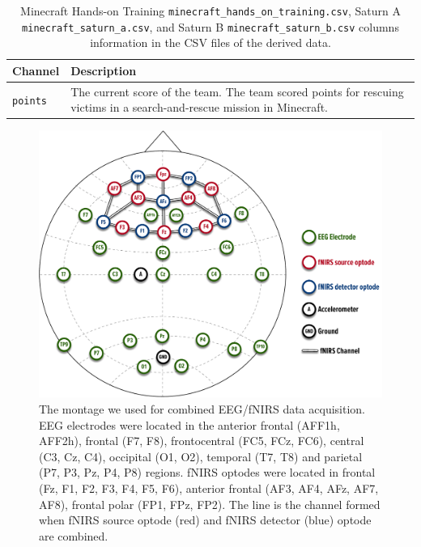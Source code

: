 
\begin{table}[h]
\centering
\begin{tabularx}{\textwidth}{lX}
    \toprule
Channel & Description \\
\midrule
\texttt{points} & The current score of the team. The team scored points for rescuing victims in a search-and-rescue mission in Minecraft.\\
\bottomrule
\end{tabularx}
\caption{Minecraft Hands-on Training \texttt{minecraft\_hands\_on\_training.csv}, Saturn A \texttt{minecraft\_saturn\_a.csv}, and Saturn B \texttt{minecraft\_saturn\_b.csv} columns information in the CSV files of the derived data.}
\label{tab:minecraft_task_columns}
\end{table}


\begin{figure}
  \includegraphics[width=\linewidth]{images/combined_montage.pdf}
  \centering
  \caption{%
      The montage we used for combined EEG/fNIRS data acquisition.  EEG
      electrodes were located in the anterior frontal (AFF1h, AFF2h), frontal
      (F7, F8), frontocentral (FC5, FCz, FC6), central (C3, Cz, C4),
      occipital (O1, O2), temporal (T7, T8) and parietal (P7, P3, Pz, P4, P8)
      regions.  fNIRS optodes were located in frontal (Fz, F1, F2, F3, F4,
      F5, F6), anterior frontal (AF3, AF4, AFz, AF7, AF8), frontal polar
      (FP1, FPz, FP2). The line is the channel formed when fNIRS source
      optode (red) and fNIRS detector (blue) optode are combined.
  }
  \label{fig:combined-montage}
\end{figure}


